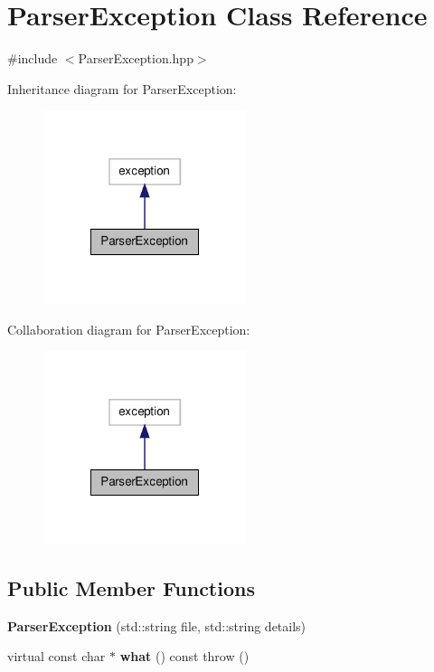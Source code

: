 \hypertarget{class_parser_exception}{\section{Parser\-Exception Class Reference}
\label{class_parser_exception}
}


{\ttfamily \#include $<$Parser\-Exception.\-hpp$>$}



Inheritance diagram for Parser\-Exception\-:
\nopagebreak
\begin{figure}[H]
\begin{center}
\leavevmode
\includegraphics[width=168pt]{class_parser_exception__inherit__graph}
\end{center}
\end{figure}


Collaboration diagram for Parser\-Exception\-:
\nopagebreak
\begin{figure}[H]
\begin{center}
\leavevmode
\includegraphics[width=168pt]{class_parser_exception__coll__graph}
\end{center}
\end{figure}
\subsection*{Public Member Functions}
\begin{DoxyCompactItemize}
\item 
\hypertarget{class_parser_exception_a18e003c405f72e31acd0b9dd334f3a83}{{\bfseries Parser\-Exception} (std\-::string file, std\-::string details)}\label{class_parser_exception_a18e003c405f72e31acd0b9dd334f3a83}

\item 
\hypertarget{class_parser_exception_ad5dae7689577ab44fe945ff9ee7817fe}{virtual const char $\ast$ {\bfseries what} () const   throw ()}\label{class_parser_exception_ad5dae7689577ab44fe945ff9ee7817fe}

\end{DoxyCompactItemize}


